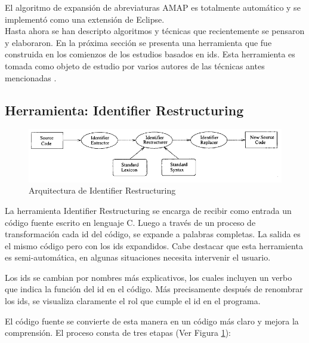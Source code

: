 El algoritmo de expansión de abreviaturas AMAP es totalmente automático y se implementó como una extensión de Eclipse.\\ %

Hasta ahora se han descripto algoritmos y técnicas que recientemente se pensaron y elaboraron. En la próxima sección se presenta una herramienta que fue construida en los comienzos de los estudios basados en ids. Esta herramienta es tomada como objeto de estudio por varios autores de las técnicas antes mencionadas \cite{EZH08,DCHD06,DLHD06,LFBEX07}.


\pagebreak 
\subsection{Herramienta: Identifier Restructuring}
\label{sec:algRest}


\begin{figure}[t!] %
\centerline{%
\includegraphics[scale= 0.80]{./cap3/ire_1.png}
}
\caption{Arquitectura de Identifier Restructuring}
\label{ire1}
\end{figure}

La herramienta Identifier Restructuring \cite{BCPT00} se encarga de recibir como entrada un código fuente escrito en lenguaje C. Luego a través de un proceso de transformación cada id del código, se expande a palabras completas. La salida es el mismo código pero con los ids expandidos.
Cabe destacar que esta herramienta es semi-automática, en algunas situaciones necesita intervenir el usuario.

Los ids se cambian por nombres más explicativos, los cuales incluyen un verbo que indica la función del id en el código. Más precisamente después de renombrar los ids, se visualiza claramente el rol que cumple el id en el programa.

El código fuente se convierte de esta manera en un código más claro y mejora la comprensión. El proceso consta de tres etapas (Ver Figura \ref{ire1}): 

